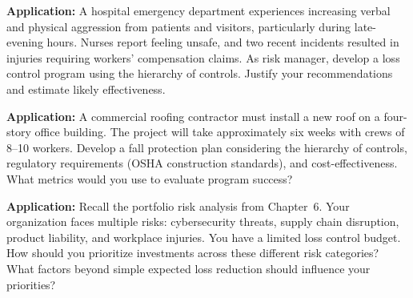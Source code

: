 \documentclass[11pt,openany]{book}
\begin{document}
\begin{discussionquestions}
\item \textbf{Application:} A hospital emergency department experiences
  increasing verbal and physical aggression from patients and visitors,
  particularly during late-evening hours. Nurses report feeling unsafe, and
  two recent incidents resulted in injuries requiring workers' compensation
  claims. As risk manager, develop a loss control program using the hierarchy
  of controls. Justify your recommendations and estimate likely effectiveness.

\item \textbf{Application:} A commercial roofing contractor must install a new
  roof on a four-story office building. The project will take approximately
  six weeks with crews of 8--10 workers. Develop a fall protection plan
  considering the hierarchy of controls, regulatory requirements (OSHA
  construction standards), and cost-effectiveness. What metrics would you use
  to evaluate program success?

\item \textbf{Application:} Recall the portfolio risk analysis from
  Chapter~6. Your organization faces multiple risks: cybersecurity threats,
  supply chain disruption, product liability, and workplace injuries. You have
  a limited loss control budget. How should you prioritize investments across
  these different risk categories? What factors beyond simple expected loss
  reduction should influence your priorities?
\end{discussionquestions}
\end{document}
